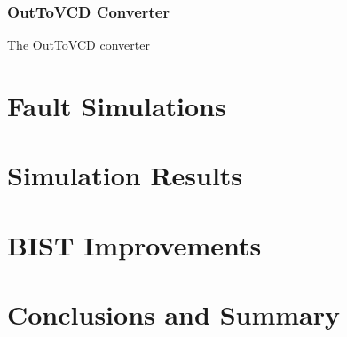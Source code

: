 \documentclass[12pt]{report}
\begin{document}
\subsection{OutToVCD Converter}
The OutToVCD converter

\chapter{Fault Simulations}

\chapter{Simulation Results}

\chapter{BIST Improvements}

\chapter{Conclusions and Summary}
\end{document}
